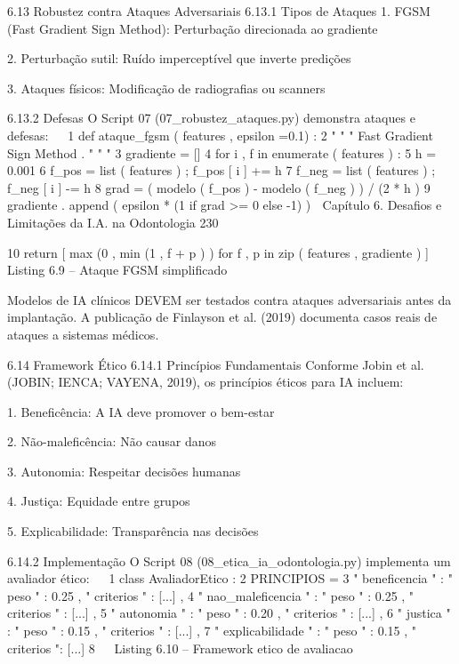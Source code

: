  6.13       Robustez contra Ataques Adversariais
 6.13.1     Tipos de Ataques
     1. FGSM (Fast Gradient Sign Method): Perturbação direcionada ao gradiente

     2. Perturbação sutil: Ruído imperceptível que inverte predições

     3. Ataques físicos: Modificação de radiografias ou scanners

 6.13.2     Defesas
 O Script 07 (07_robustez_ataques.py) demonstra ataques e defesas:
                                                                                                  
1 def ataque_fgsm ( features , epsilon =0.1) :
2     " " " Fast Gradient Sign Method . " " "
3     gradiente = []
4     for i , f in enumerate ( features ) :
5            h = 0.001
6            f_pos = list ( features ) ; f_pos [ i ] += h
7            f_neg = list ( features ) ; f_neg [ i ] -= h
8            grad = ( modelo ( f_pos ) - modelo ( f_neg ) ) / (2 * h )
9            gradiente . append ( epsilon * (1 if grad >= 0 else -1) )
     Capítulo 6. Desafios e Limitações da I.A. na Odontologia                                230


10        return [ max (0 , min (1 , f + p ) ) for f , p in zip ( features , gradiente ) ]
                                                                                                  
                               Listing 6.9 – Ataque FGSM simplificado


         Modelos de IA clínicos DEVEM ser testados contra ataques adversariais antes
         da implantação. A publicação de Finlayson et al. (2019) documenta casos reais
         de ataques a sistemas médicos.


     6.14       Framework Ético
     6.14.1     Princípios Fundamentais
     Conforme Jobin et al. (JOBIN; IENCA; VAYENA, 2019), os princípios éticos para IA
     incluem:

         1. Beneficência: A IA deve promover o bem-estar

         2. Não-maleficência: Não causar danos

         3. Autonomia: Respeitar decisões humanas

         4. Justiça: Equidade entre grupos

         5. Explicabilidade: Transparência nas decisões

     6.14.2     Implementação
     O Script 08 (08_etica_ia_odontologia.py) implementa um avaliador ético:
                                                                                                  
 1 class AvaliadorEtico :
 2     PRINCIPIOS = {
 3         " beneficencia " : { " peso " : 0.25 , " criterios " : [...]} ,
 4         " nao_maleficencia " : { " peso " : 0.25 , " criterios " : [...]} ,
 5         " autonomia " : { " peso " : 0.20 , " criterios " : [...]} ,
 6         " justica " : { " peso " : 0.15 , " criterios " : [...]} ,
 7         " explicabilidade " : { " peso " : 0.15 , " criterios ": [...]}
 8     }
                                                                                                  
                             Listing 6.10 – Framework etico de avaliacao


